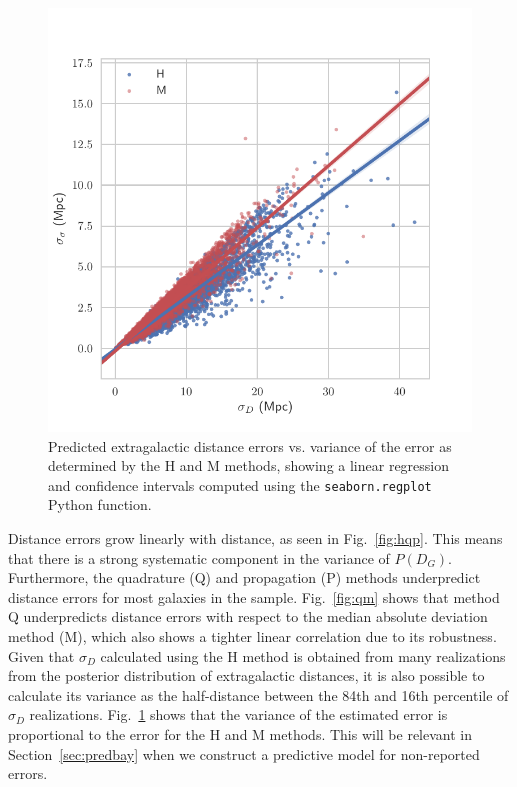 \documentclass[a4paper,fleqn,usenatbib]{mnras}
\begin{document}
\begin{figure}

	\includegraphics[scale=0.7]{ee}
    \caption{Predicted extragalactic distance errors vs. variance of the error as determined by the H and M methods, showing a linear regression and confidence intervals computed using the \texttt{seaborn.regplot} Python function. }
    \label{fig:ee}
\end{figure}

Distance errors grow linearly with distance, as seen in Fig.~\ref{fig:hqp}. This means that there is a strong systematic component in the variance of $P(D_G)$. Furthermore, the quadrature (Q) and propagation (P) methods underpredict distance errors for most galaxies in the sample. Fig.~\ref{fig:qm} shows that method Q underpredicts distance errors with respect to the median absolute deviation method (M), which also shows a tighter linear correlation due to its robustness.\\

Given that $\sigma_D$ calculated using the H method is obtained from many realizations from the posterior distribution of extragalactic distances, it is also possible to calculate its variance as the half-distance between the 84th and 16th percentile of $\sigma_D$ realizations. Fig.~\ref{fig:ee} shows that the variance of the estimated error is proportional to the error for the H and M methods. This will be relevant in Section~\ref{sec:predbay} when we construct a predictive model for non-reported errors.
\end{document}

